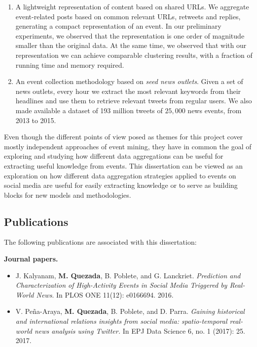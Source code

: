 \begin{intro}
\begin{enumerate}
\item A lightweight representation of content based on shared URLs.
%
We aggregate event-related posts based on common relevant URLs, retweets and
replies, generating a compact representation of an event.
%
In our preliminary experiments, we observed that the representation is one order
of magnitude smaller than the original data.
%
At the same time, we observed that with our representation we can achieve
comparable clustering results, with a fraction of running time and memory
required.

\item An event collection methodology based on {\em seed news outlets}.
%
Given a set of news outlets, every hour we extract the most relevant keywords
from their headlines and use them to retrieve relevant tweets from regular
users.
%
We also made available a dataset of 193 million tweets of $25,000$ news events,
from 2013 to 2015.
\end{enumerate}

Even though the different points of view posed as themes for this project cover
mostly independent approaches of event mining, they have in common the goal of
exploring and studying how different data aggregations can be useful for
extracting useful knowledge from events. 
%
This dissertation can be viewed as an exploration on how different data
aggregation strategies applied to events on social media are useful for easily
extracting knowledge or to serve as building blocks for new models and
methodologies.




\subsection*{Publications} 

The following publications are associated with this dissertation:

{\bf Journal papers.}
\begin{itemize}
    \item J. Kalyanam, {\bf M. Quezada}, B. Poblete, and G. Lanckriet. {\em
     Prediction and Characterization of High-Activity Events in Social Media
     Triggered by Real-World News}. In PLOS ONE 11(12): e0166694. 2016.

    \item V. Peña-Araya, {\bf M. Quezada}, B. Poblete, and D. Parra. {\em
    Gaining historical and international relations insights from social media:
    spatio-temporal real-world news analysis using Twitter.} In EPJ Data Science
    6, no. 1 (2017): 25. 2017.
\end{itemize}



\end{intro}
